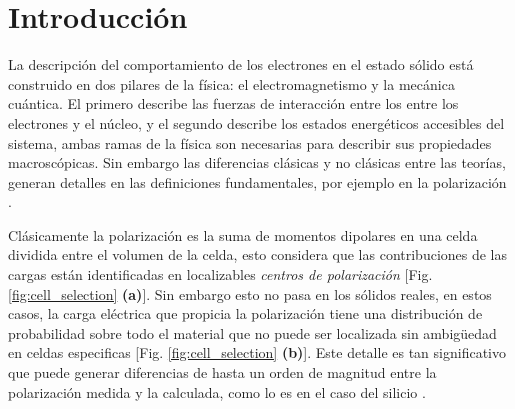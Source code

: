 \chapter{Introducción} %



La descripción del comportamiento de los electrones en el estado sólido está construido en dos pilares de la física: el electromagnetismo y la mecánica cuántica. El primero describe las fuerzas de interacción entre los entre los electrones y el núcleo, y el segundo describe los estados energéticos accesibles del sistema, ambas ramas de la física son necesarias para describir sus propiedades macroscópicas. Sin embargo las diferencias clásicas y no clásicas entre las teorías, generan detalles en las definiciones fundamentales, por ejemplo en la polarización \cite{Shore2018}.


Clásicamente la polarización es la suma de momentos dipolares en una celda dividida entre el volumen de la celda, esto considera que las contribuciones de las cargas están identificadas en localizables {\it centros de polarización} [Fig. \ref{fig:cell_selection} \textbf{(a)}]. Sin embargo esto no pasa en los sólidos reales, en estos casos, la carga eléctrica que propicia la polarización tiene una distribución de probabilidad sobre todo el material que no puede ser localizada sin ambigüedad en celdas especificas [Fig. \ref{fig:cell_selection} \textbf{(b)}]. Este detalle es tan significativo que puede generar diferencias de hasta un orden de magnitud entre la polarización medida y la calculada, como lo es en el caso del silicio \cite{rabe2007modern}.


